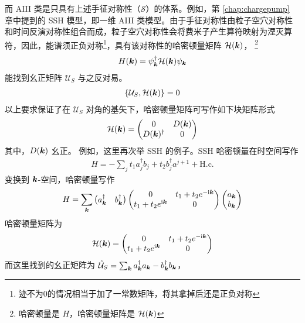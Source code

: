 而 AIII 类是只具有上述手征对称性（$\mathcal{S}$）的体系。例如，第 \ref{chap:chargepump} 章中提到的 SSH 模型，即一维 AIII 类模型。由于手征对称性由粒子空穴对称性和时间反演对称性组合而成，粒子空穴对称性会将费米子产生算符映射为湮灭算符，因此，能谱须正负对称\footnote{迹不为0的情况相当于加了一常数矩阵，将其拿掉后还是正负对称}，具有该对称性的哈密顿量矩阵 $\mathcal{H}(\boldsymbol{k})$，
\footnote{哈密顿量是 $H$，哈密顿量矩阵是 $\mathcal{H}(\boldsymbol{k})$}
\begin{align}
H(\boldsymbol{k}) = \psi_{\boldsymbol{k}}^{\dag}\mathcal{H}(\boldsymbol{k})\psi_{\boldsymbol{k}}
\end{align}
能找到幺正矩阵 $\mathcal{U}_S$ 与之反对易。
\begin{align}
\{\mathcal{U}_S, \mathcal{H}(\boldsymbol{k})\} = 0
\end{align}
以上要求保证了在 $\mathcal{U}_S$ 对角的基矢下，哈密顿量矩阵可写作如下块矩阵形式
\begin{align}
\mathcal{H}(\boldsymbol{k}) = \begin{pmatrix}
0 & D(\boldsymbol{k}) \\
D(\boldsymbol{k})^{\dagger} & 0
\end{pmatrix}
\end{align}
其中，$D(\boldsymbol{k})$ 幺正。
例如，这里再次举 SSH 的例子。SSH 哈密顿量在时空间写作
\begin{align}
H = -\sum_jt_1a^{\dagger}_{j}b_{j} + t_2 b^{\dagger}_ja^{j+1} + \text{H.c.}
\end{align}
变换到 $\boldsymbol{k}$-空间，哈密顿量写作
\begin{align}
H = \sum_{\boldsymbol{k}}
\begin{pmatrix}
a_{\boldsymbol{k}}^{\dag} & b_{\boldsymbol{k}}^{\dag}
\end{pmatrix}
\begin{pmatrix}
0 & t_1 + t_2e^{-\mathrm{i}\boldsymbol{k}} \\
t_1 + t_2e^{\mathrm{i}\boldsymbol{k}} & 0
\end{pmatrix}
\begin{pmatrix}
a_{\boldsymbol{k}} \\ b_{\boldsymbol{k}}
\end{pmatrix}
\end{align}
哈密顿量矩阵为
\begin{align}
\mathcal{H}(\boldsymbol{k}) = 
\begin{pmatrix}
0 & t_1 + t_2e^{-\mathrm{i}\boldsymbol{k}} \\
t_1 + t_2e^{\mathrm{i}\boldsymbol{k}} & 0
\end{pmatrix}
\end{align}
而这里找到的幺正矩阵为 $\hat{\mathcal{U}}_S = \sum_{\boldsymbol{k}} a^{\dag}_{\boldsymbol{k}}a_{\boldsymbol{k}} - b^{\dag}_{\boldsymbol{k}}b_{\boldsymbol{k}} $，
